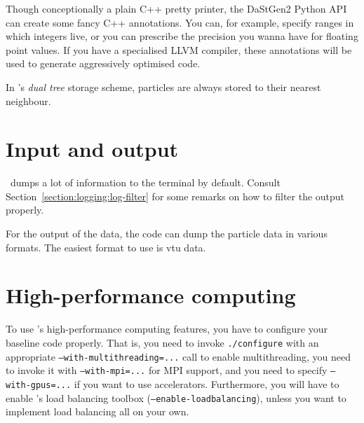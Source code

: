 \begin{remark}
 Though conceptionally a plain C++ pretty printer, the DaStGen2 Python API
 can create some fancy C++ annotations. You can, for example, specify ranges
 in which integers live, or you can prescribe the precision you wanna have 
 for floating point values. If you have a specialised LLVM compiler, these
 annotations will be used to generate aggressively optimised code.
\end{remark}


\begin{definition}
 In \Swift's \emph{dual tree} storage scheme, particles are always stored to
 their nearest neighbour.
\end{definition}


\section{Input and output}

\Peano\ dumps a lot of information to the terminal by default. Consult
Section~\ref{section:logging:log-filter} for some remarks on how to filter the
output properly.


For the output of the data, the code can dump the particle data in various 
formats.
The easiest format to use is vtu data.






\section{High-performance computing}
\label{section:particles:swift:hpc}

To use \Peano's high-performance computing features, you have to configure your
baseline code properly.
That is, you need to invoke \texttt{./configure} with an appropriate
\texttt{--with-multithreading=...} call to enable multithreading, 
you need to invoke it with \texttt{--with-mpi=...} for MPI support, and you need
to specify \texttt{--with-gpus=...} if you want to use accelerators.
Furthermore, you will have to enable \Peano's load balancing toolbox
(\texttt{--enable-loadbalancing}), unless you want to implement load balancing all on
your own.






